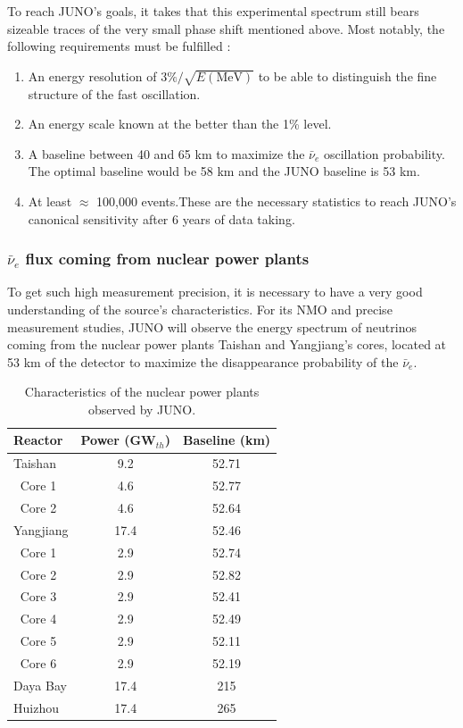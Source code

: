 \documentclass[../main.tex]{subfiles}
\begin{document}
To reach JUNO's goals, it takes that this experimental spectrum still bears sizeable traces of the very small phase shift mentioned above. Most notably, the
following requirements must be fulfilled :
\begin{enumerate}
  \item An energy resolution of $3\%/\sqrt{E\mathrm{(MeV)}}$ to be able to distinguish the fine structure of the fast oscillation.
  \item An energy scale known at the better than the 1\% level.
  \item A baseline between 40 and 65 km to maximize the $\bar{\nu}_e$ oscillation probability. The optimal baseline would be 58 km and the JUNO baseline is 53 km.
  \item At least $\approx$ 100,000 events.These are the necessary statistics to reach JUNO's canonical sensitivity after 6 years of data taking.
\end{enumerate}

\subsubsection{$\bar{\nu}_e$ flux coming from nuclear power plants}
\label{sec:juno:nu_e_flux}

To get such high measurement precision, it is necessary to have a very good understanding of the source's characteristics. For its NMO and precise measurement studies, JUNO will observe the energy spectrum of neutrinos coming from the nuclear power plants Taishan and Yangjiang's cores, located at 53 km of the detector to maximize the disappearance probability of the $\bar{\nu}_e$.

\begin{table}[ht]
  \centering
  \begin{tabular}{l c c}
    \hline
    Reactor & Power (GW$_{th}$) & Baseline (km) \\
    \hline
    Taishan    & 9.2  & 52.71 \\
    $~$ Core 1 & 4.6  & 52.77 \\
    $~$ Core 2 & 4.6  & 52.64 \\
    Yangjiang  & 17.4 & 52.46 \\
    $~$ Core 1 & 2.9  & 52.74 \\
    $~$ Core 2 & 2.9  & 52.82 \\
    $~$ Core 3 & 2.9  & 52.41 \\
    $~$ Core 4 & 2.9  & 52.49 \\
    $~$ Core 5 & 2.9  & 52.11 \\
    $~$ Core 6 & 2.9  & 52.19 \\
    Daya Bay   & 17.4 & 215   \\
    Huizhou    & 17.4 & 265   \\
    \hline
  \end{tabular}
  \caption{Characteristics of the nuclear power plants observed by JUNO.}
  \label{tab:juno:power_plants}
\end{table}
\end{document}
